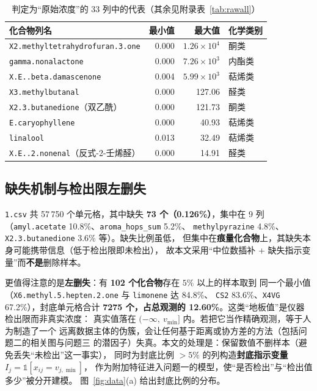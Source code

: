 \begin{table}[H]
\centering
\caption{判定为“原始浓度”的 33 列中的代表（其余见附录表~\ref{tab:rawall}）}
\label{tab:rawcol}
\small
\begin{fittable}
\begin{tabular}{@{}lrrl@{}}
\toprule
化合物列名 & 最小值 & 最大值 & 化学类别 \\
\midrule
\texttt{X2.methyltetrahydrofuran.3.one} & 0.000 & $1.26\times10^{4}$ & 酮类 \\
\texttt{gamma.nonalactone} & 0.000 & $7.26\times10^{3}$ & 内酯类 \\
\texttt{X.E..beta.damascenone} & 0.004 & $5.99\times10^{3}$ & 萜烯类 \\
\texttt{X3.methylbutanal} & 0.000 & 127.06 & 醛类 \\
\texttt{X2.3.butanedione}（双乙酰） & 0.000 & 121.73 & 酮类 \\
\texttt{E.caryophyllene} & 0.000 & 40.93 & 萜烯类 \\
\texttt{linalool} & 0.013 & 32.49 & 萜烯类 \\
\texttt{X.E..2.nonenal}（反式-2-壬烯醛） & 0.000 & 14.91 & 醛类 \\
\bottomrule
\end{tabular}
\end{fittable}
\end{table}

\subsection{缺失机制与检出限左删失}

\texttt{1.csv} 共 57\,750 个单元格，其中缺失 \textbf{73 个（0.126\%）}，集中在
9 列（\texttt{amyl.acetate} 10.8\%、\texttt{aroma\_hops\_sum} 5.2\%、
\texttt{methylpyrazine} 4.8\%、\texttt{X2.3.butanedione} 3.6\% 等）。缺失比例虽低，
但集中在\textbf{痕量化合物}上，其缺失本身可能携带信息（低于检出限即未检出），
故本文采用“中位数插补 + 缺失指示变量”而\textbf{不是}删除样本。

更值得注意的是\textbf{左删失}：有 \textbf{102 个化合物}存在 $5\%$ 以上的样本取到
同一个最小值（\texttt{X6.methyl.5.hepten.2.one} 与 \texttt{limonene} 达 84.8\%、
\texttt{CS2} 83.6\%、\texttt{X4VG} 67.2\%），封底单元格合计
\textbf{7275 个，占总观测的 12.60\%}。这类“地板值”是仪器检出限而非真实浓度：
真实值落在 $(-\infty,\ v_{\min}]$ 内。若把它当作精确观测，等于人为制造了一个
远离数据主体的伪簇，会让任何基于距离或协方差的方法（包括问题二的相关图与问题三
的潜因子）失真。本文的处理是：保留数值不删样本（避免丢失“未检出”这一事实），
同时为封底比例 $>5\%$ 的列构造\textbf{封底指示变量} $I_j=\mathbb{1}[x_{ij}=v_{j,\min}]$，
作为附加特征进入问题一的模型，使“是否检出”与“检出值多少”被分开建模。
图~\ref{fig:data}(a) 给出封底比例的分布。

